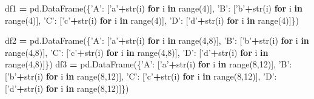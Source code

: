 \documentclass[
  letterpaper,
]{scrbook}
\newenvironment{Shaded}{\begin{snugshade}}{\end{snugshade}}
\newcommand{\BuiltInTok}[1]{#1}
\newcommand{\ControlFlowTok}[1]{\textcolor[rgb]{0.13,0.29,0.53}{\textbf{#1}}}
\newcommand{\DecValTok}[1]{\textcolor[rgb]{0.00,0.00,0.81}{#1}}
\newcommand{\KeywordTok}[1]{\textcolor[rgb]{0.13,0.29,0.53}{\textbf{#1}}}
\newcommand{\NormalTok}[1]{#1}
\newcommand{\OperatorTok}[1]{\textcolor[rgb]{0.81,0.36,0.00}{\textbf{#1}}}
\newcommand{\StringTok}[1]{\textcolor[rgb]{0.31,0.60,0.02}{#1}}
\begin{document}
\begin{Shaded}
\begin{Highlighting}[]
\NormalTok{df1 }\OperatorTok{=}\NormalTok{ pd.DataFrame(\{}\StringTok{'A'}\NormalTok{: [}\StringTok{'a'}\OperatorTok{+}\BuiltInTok{str}\NormalTok{(i) }\ControlFlowTok{for}\NormalTok{ i }\KeywordTok{in} \BuiltInTok{range}\NormalTok{(}\DecValTok{4}\NormalTok{)],}
    \StringTok{'B'}\NormalTok{: [}\StringTok{'b'}\OperatorTok{+}\BuiltInTok{str}\NormalTok{(i) }\ControlFlowTok{for}\NormalTok{ i }\KeywordTok{in} \BuiltInTok{range}\NormalTok{(}\DecValTok{4}\NormalTok{)],}
    \StringTok{'C'}\NormalTok{: [}\StringTok{'c'}\OperatorTok{+}\BuiltInTok{str}\NormalTok{(i) }\ControlFlowTok{for}\NormalTok{ i }\KeywordTok{in} \BuiltInTok{range}\NormalTok{(}\DecValTok{4}\NormalTok{)],}
    \StringTok{'D'}\NormalTok{: [}\StringTok{'d'}\OperatorTok{+}\BuiltInTok{str}\NormalTok{(i) }\ControlFlowTok{for}\NormalTok{ i }\KeywordTok{in} \BuiltInTok{range}\NormalTok{(}\DecValTok{4}\NormalTok{)]\})}

\NormalTok{df2 }\OperatorTok{=}\NormalTok{  pd.DataFrame(\{}\StringTok{'A'}\NormalTok{: [}\StringTok{'a'}\OperatorTok{+}\BuiltInTok{str}\NormalTok{(i) }\ControlFlowTok{for}\NormalTok{ i }\KeywordTok{in} \BuiltInTok{range}\NormalTok{(}\DecValTok{4}\NormalTok{,}\DecValTok{8}\NormalTok{)],}
    \StringTok{'B'}\NormalTok{: [}\StringTok{'b'}\OperatorTok{+}\BuiltInTok{str}\NormalTok{(i) }\ControlFlowTok{for}\NormalTok{ i }\KeywordTok{in} \BuiltInTok{range}\NormalTok{(}\DecValTok{4}\NormalTok{,}\DecValTok{8}\NormalTok{)],}
    \StringTok{'C'}\NormalTok{: [}\StringTok{'c'}\OperatorTok{+}\BuiltInTok{str}\NormalTok{(i) }\ControlFlowTok{for}\NormalTok{ i }\KeywordTok{in} \BuiltInTok{range}\NormalTok{(}\DecValTok{4}\NormalTok{,}\DecValTok{8}\NormalTok{)],}
    \StringTok{'D'}\NormalTok{: [}\StringTok{'d'}\OperatorTok{+}\BuiltInTok{str}\NormalTok{(i) }\ControlFlowTok{for}\NormalTok{ i }\KeywordTok{in} \BuiltInTok{range}\NormalTok{(}\DecValTok{4}\NormalTok{,}\DecValTok{8}\NormalTok{)]\})}
\NormalTok{df3 }\OperatorTok{=}\NormalTok{  pd.DataFrame(\{}\StringTok{'A'}\NormalTok{: [}\StringTok{'a'}\OperatorTok{+}\BuiltInTok{str}\NormalTok{(i) }\ControlFlowTok{for}\NormalTok{ i }\KeywordTok{in} \BuiltInTok{range}\NormalTok{(}\DecValTok{8}\NormalTok{,}\DecValTok{12}\NormalTok{)],}
    \StringTok{'B'}\NormalTok{: [}\StringTok{'b'}\OperatorTok{+}\BuiltInTok{str}\NormalTok{(i) }\ControlFlowTok{for}\NormalTok{ i }\KeywordTok{in} \BuiltInTok{range}\NormalTok{(}\DecValTok{8}\NormalTok{,}\DecValTok{12}\NormalTok{)],}
    \StringTok{'C'}\NormalTok{: [}\StringTok{'c'}\OperatorTok{+}\BuiltInTok{str}\NormalTok{(i) }\ControlFlowTok{for}\NormalTok{ i }\KeywordTok{in} \BuiltInTok{range}\NormalTok{(}\DecValTok{8}\NormalTok{,}\DecValTok{12}\NormalTok{)],}
    \StringTok{'D'}\NormalTok{: [}\StringTok{'d'}\OperatorTok{+}\BuiltInTok{str}\NormalTok{(i) }\ControlFlowTok{for}\NormalTok{ i }\KeywordTok{in} \BuiltInTok{range}\NormalTok{(}\DecValTok{8}\NormalTok{,}\DecValTok{12}\NormalTok{)]\})}
\end{Highlighting}
\end{Shaded}
\end{document}
